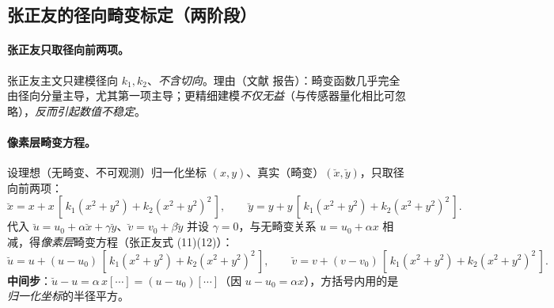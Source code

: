 \subsection{张正友的径向畸变标定（两阶段）}
\label{sec:calib-radial}

\paragraph{张正友只取径向前两项。}
张正友主文只建模径向 $k_1,k_2$、\emph{不含切向}\cite{zhang2000calibration}。理由（文献\cite{tsai1987versatile,weng1992distortion} 报告）：畸变函数几乎完全由径向分量主导，尤其第一项主导；更精细建模\emph{不仅无益}（与传感器量化相比可忽略），\emph{反而引起数值不稳定}。

\paragraph{像素层畸变方程。}
设理想（无畸变、不可观测）归一化坐标 $(x,y)$、真实（畸变）$(\breve x,\breve y)$，只取径向前两项\cite{zhang2000calibration}：
\begin{equation}
  \breve x = x + x\,[\,k_1(x^2+y^2)+k_2(x^2+y^2)^2\,],\qquad
  \breve y = y + y\,[\,k_1(x^2+y^2)+k_2(x^2+y^2)^2\,].
\end{equation}
代入 $\breve u=u_0+\alpha\breve x+\gamma\breve y$、$\breve v=v_0+\beta\breve y$ 并设 $\gamma=0$，与无畸变关系 $u=u_0+\alpha x$ 相减，得\emph{像素层}畸变方程（张正友式 (11)(12)\cite{zhang2000calibration}）：
\begin{equation}
  \breve u = u + (u-u_0)\,[\,k_1(x^2+y^2)+k_2(x^2+y^2)^2\,],\qquad
  \breve v = v + (v-v_0)\,[\,k_1(x^2+y^2)+k_2(x^2+y^2)^2\,].
  \label{eq:calib-radial-pixel}
\end{equation}
\textbf{中间步}：$\breve u-u=\alpha\,x[\cdots]=(u-u_0)[\cdots]$（因 $u-u_0=\alpha x$），方括号内用的是\emph{归一化坐标}的半径平方。

